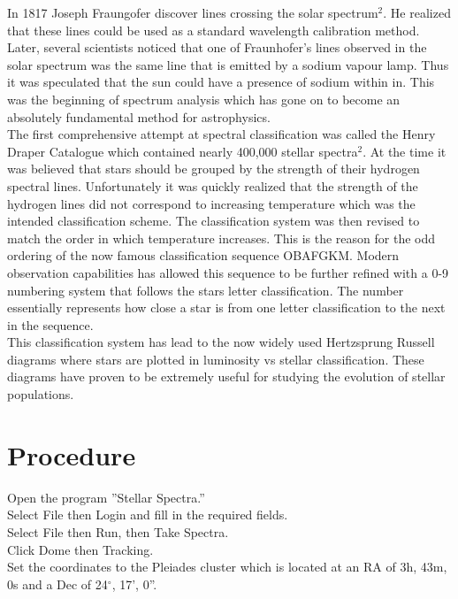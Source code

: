 \documentclass{article}
\begin{document}
In 1817 Joseph Fraungofer discover lines crossing the solar spectrum$^2$. He realized that these lines could be used as a standard wavelength calibration method. Later, several scientists noticed that one of Fraunhofer's lines observed in the solar spectrum was the same line that is emitted by a sodium vapour lamp. Thus it was speculated that the sun could have a presence of sodium within in. This was the beginning of spectrum analysis which has gone on to become an absolutely fundamental method for astrophysics.\\

The first comprehensive attempt at spectral classification was called the Henry Draper Catalogue which contained nearly 400,000 stellar spectra$^2$. At the time it was believed that stars should be grouped by the strength of their hydrogen spectral lines. Unfortunately it was quickly realized that the strength of the hydrogen lines did not correspond to increasing temperature which was the intended classification scheme. The classification system was then revised to match the order in which temperature increases. This is the reason for the odd ordering of the now famous classification sequence OBAFGKM. Modern observation capabilities has allowed this sequence to be further refined with a 0-9 numbering system that follows the stars letter classification. The number essentially represents how close a star is from one letter classification to the next in the sequence.\\

This classification system has lead to the now widely used Hertzsprung Russell diagrams where stars are plotted in luminosity vs stellar classification. These diagrams have proven to be extremely useful for studying the evolution of stellar populations.
\section{Procedure}
Open the program ''Stellar Spectra.'' \\

Select File then Login and fill in the required fields. \\

Select File then Run, then Take Spectra.\\

Click Dome then Tracking.\\

Set the coordinates to the Pleiades cluster which is located at an RA of 3h, 43m, 0s and a Dec of 24$^\circ$, 17', 0''. \\
\end{document}
